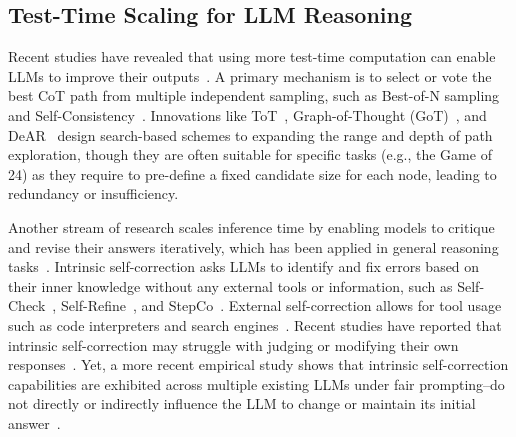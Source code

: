 \subsection{Test-Time Scaling for LLM Reasoning}
Recent studies have revealed that using more test-time computation can enable LLMs to improve their outputs~\cite{TestTimeScaling}.
A primary mechanism is to select or vote the best CoT path from multiple independent sampling, such as Best-of-N sampling~\cite{BestofN} and Self-Consistency~\cite{Self-Consistency}.
Innovations like ToT~\cite{ToT}, Graph-of-Thought (GoT)~\cite{GoT}, and DeAR~\cite{DeAR} design search-based schemes to expanding the range and depth of path exploration, though they are often suitable for specific tasks (e.g., the Game of 24) as they require to pre-define a fixed candidate size for each node, leading to redundancy or insufficiency.

Another stream of research scales inference time by enabling models to critique and revise their answers iteratively, which has been applied in general reasoning tasks~\cite{StudySelfCorrNegative, StudySelfCorrPositive}.
Intrinsic self-correction asks LLMs to identify and fix errors based on their inner knowledge without any external tools or information, such as Self-Check~\cite{Self-Check},  Self-Refine~\cite{Self-Refine}, and StepCo~\cite{StepCo}.
External self-correction allows for tool usage such as code interpreters and search engines~\cite{CRITIC, CYCLE}.
Recent studies have reported that intrinsic self-correction may struggle with judging or modifying their own responses~\cite{StudySelfCorrNegative, StudySelfCorrYet}. Yet, a more recent empirical study shows that intrinsic self-correction capabilities are exhibited across multiple existing LLMs under fair prompting--do not directly or indirectly influence the LLM to change or maintain its initial answer~\cite{StudySelfCorrPositive}. 




